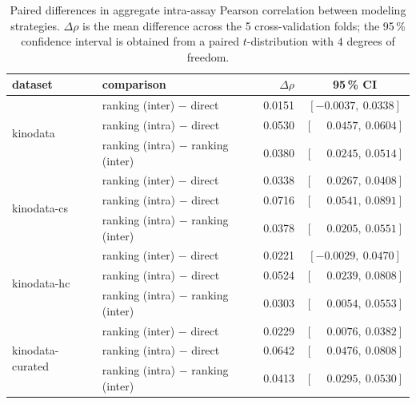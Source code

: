 \begin{table}[tb]
\centering
\caption{\label{tab:pairwise-differences-kinodata}Paired differences in aggregate intra-assay Pearson
correlation between modeling strategies. $\Delta\rho$ is the mean difference across the 5
cross-validation folds; the 95\,\% confidence interval is obtained from a paired $t$-distribution
with $4$ degrees of freedom.}
\begin{tabular}{llrc}
\toprule
{dataset} & {comparison} & {$\Delta\rho$} & {95\,\% CI} \\
\midrule
\multirow[t]{3}{*}{kinodata}
 & ranking (inter) $-$ direct & 0.0151 & $[-0.0037,\ 0.0338]$ \\
 & ranking (intra) $-$ direct & 0.0530 & $[\phantom{-}0.0457,\ 0.0604]$ \\
 & ranking (intra) $-$ ranking (inter) & 0.0380 & $[\phantom{-}0.0245,\ 0.0514]$ \\
\midrule
\multirow[t]{3}{*}{kinodata-cs}
 & ranking (inter) $-$ direct & 0.0338 & $[\phantom{-}0.0267,\ 0.0408]$ \\
 & ranking (intra) $-$ direct & 0.0716 & $[\phantom{-}0.0541,\ 0.0891]$ \\
 & ranking (intra) $-$ ranking (inter) & 0.0378 & $[\phantom{-}0.0205,\ 0.0551]$ \\
\midrule
\multirow[t]{3}{*}{kinodata-hc}
 & ranking (inter) $-$ direct & 0.0221 & $[-0.0029,\ 0.0470]$ \\
 & ranking (intra) $-$ direct & 0.0524 & $[\phantom{-}0.0239,\ 0.0808]$ \\
 & ranking (intra) $-$ ranking (inter) & 0.0303 & $[\phantom{-}0.0054,\ 0.0553]$ \\
\midrule
\multirow[t]{3}{*}{kinodata-curated}
 & ranking (inter) $-$ direct & 0.0229 & $[\phantom{-}0.0076,\ 0.0382]$ \\
 & ranking (intra) $-$ direct & 0.0642 & $[\phantom{-}0.0476,\ 0.0808]$ \\
 & ranking (intra) $-$ ranking (inter) & 0.0413 & $[\phantom{-}0.0295,\ 0.0530]$ \\
\bottomrule
\end{tabular}
\end{table}
